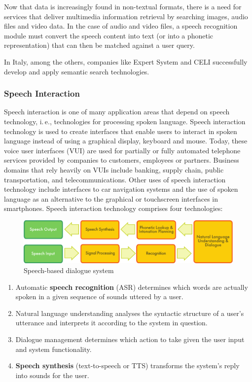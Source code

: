 \begin{multicols}{2}
Now that data is increasingly found in non-textual formats, there is a need
for services that deliver multimedia information retrieval by searching
images, audio files and video data. In the case of audio and video files, a
speech recognition module must convert the speech content into text (or into a
phonetic representation) that can then be matched against a user query.

In Italy, among the others, companies like Expert System and CELI successfully develop and apply semantic search technologies.


\subsubsection{Speech Interaction}


Speech interaction is one of many application areas that depend on
speech technology, i.\,e., technologies for processing spoken
language. Speech interaction technology is used to create interfaces
that enable users to interact in spoken language instead of using a
graphical display, keyboard and mouse.  Today, these voice user
interfaces (VUI) are used for partially or fully automated telephone
services provided by companies to customers, employees or
partners. Business domains that rely heavily on VUIs include banking,
supply chain, public transportation, and telecommunications. Other
uses of speech interaction technology include interfaces to car
navigation systems and the use of spoken language as an alternative to
the graphical or touchscreen interfaces in smartphones. Speech
interaction technology comprises four technologies:


\begin{figure}[htb]
  \center
  \includegraphics[width=\textwidth]{../_media/english/simple_speech-based_dialogue_architecture}
  \caption{Speech-based dialogue system}
\label{fig:dialoguearch_en}
\end{figure}


\begin{enumerate}
\item Automatic \textbf{speech recognition} (ASR) determines which words are actually spoken in a given sequence of sounds uttered by a user.
\item Natural language understanding analyses the syntactic structure of a user's utterance and interprets it according to the system in question.
\item Dialogue management determines which action to take given the user input and system functionality.
\item \textbf{Speech synthesis} (text-to-speech or TTS) transforms the
  system's reply into sounds for the user.
\end{enumerate}


\end{multicols}
